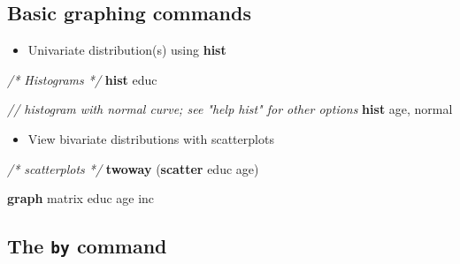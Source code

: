 \documentclass[
]{book}
\newenvironment{Shaded}{\begin{snugshade}}{\end{snugshade}}
\newcommand{\CommentTok}[1]{\textcolor[rgb]{0.56,0.35,0.01}{\textit{#1}}}
\newcommand{\FunctionTok}[1]{\textcolor[rgb]{0.00,0.00,0.00}{#1}}
\newcommand{\KeywordTok}[1]{\textcolor[rgb]{0.13,0.29,0.53}{\textbf{#1}}}
\newcommand{\NormalTok}[1]{#1}
\providecommand{\tightlist}{%
  \setlength{\itemsep}{0pt}\setlength{\parskip}{0pt}}
\begin{document}
\hypertarget{basic-graphing-commands}{%
\subsection{Basic graphing commands}\label{basic-graphing-commands}}

\begin{itemize}
\tightlist
\item
  Univariate distribution(s) using \textbf{hist}
\end{itemize}

\begin{Shaded}
\begin{Highlighting}[]
  \CommentTok{/* Histograms */}
  \KeywordTok{hist}\NormalTok{ educ}
\end{Highlighting}
\end{Shaded}

\begin{Shaded}
\begin{Highlighting}[]
  \CommentTok{// histogram with normal curve; see "help hist" for other options}
  \KeywordTok{hist}\NormalTok{ age, }\FunctionTok{normal}  
\end{Highlighting}
\end{Shaded}

\begin{itemize}
\tightlist
\item
  View bivariate distributions with scatterplots
\end{itemize}

\begin{Shaded}
\begin{Highlighting}[]
   \CommentTok{/* scatterplots */}
   \KeywordTok{twoway}\NormalTok{ (}\KeywordTok{scatter}\NormalTok{ educ age)}
\end{Highlighting}
\end{Shaded}

\begin{Shaded}
\begin{Highlighting}[]
\KeywordTok{graph} \FunctionTok{matrix}\NormalTok{ educ age inc}
\end{Highlighting}
\end{Shaded}

\hypertarget{the-by-command}{%
\subsection{\texorpdfstring{The \texttt{by} command}{The by command}}\label{the-by-command}}
\end{document}
